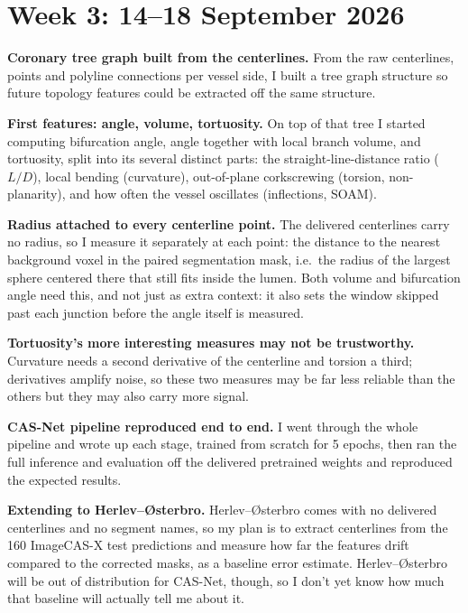 \documentclass[11pt,a4paper]{article}
\begin{document}

\section{Week 3: 14--18 September 2026}

\sectionprogress

\textbf{Coronary tree graph built from the centerlines.} From the raw centerlines, points and
polyline connections per vessel side, I built a tree graph structure so future topology features could be extracted off the same structure.


\textbf{First features: angle, volume, tortuosity.} On top of that tree I started computing
bifurcation angle, angle together with local branch volume, and tortuosity, split into its several
distinct parts: the straight-line-distance ratio ($L/D$), local bending (curvature), out-of-plane
corkscrewing (torsion, non-planarity), and how often the vessel oscillates (inflections, SOAM).

\textbf{Radius attached to every centerline point.} The delivered centerlines carry no radius, so I
measure it separately at each point: the distance to the nearest background voxel in the paired
segmentation mask, i.e.\ the radius of the largest sphere centered there that still fits inside the
lumen. Both volume and bifurcation angle need this, and not just as extra context: it also sets the
window skipped past each junction before the angle itself is measured.

\textbf{Tortuosity's more interesting measures may not be trustworthy.} Curvature needs a second derivative of the centerline and torsion a third; derivatives amplify noise, so these two measures may be far less reliable than the others but they may also carry more signal.


\textbf{CAS-Net pipeline reproduced end to end.} I went through the whole pipeline and wrote up
each stage, trained from scratch for 5 epochs, then ran the full inference and evaluation off the
delivered pretrained weights and reproduced the expected results.

\textbf{Extending to Herlev--{\O}sterbro.} Herlev--{\O}sterbro comes with no delivered centerlines
and no segment names, so my plan is to extract centerlines from the 160 ImageCAS-X test
predictions and measure how far the features drift compared to the corrected masks, as a baseline
error estimate. Herlev--{\O}sterbro will be out of distribution for CAS-Net, though, so I don't yet
know how much that baseline will actually tell me about it.
\end{document}
